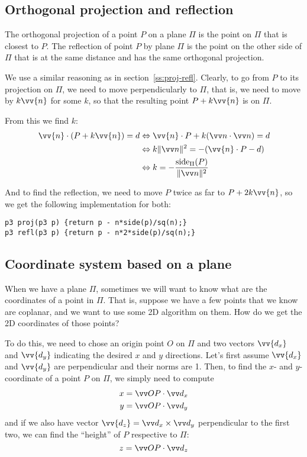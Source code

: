 \subsection{Orthogonal projection and reflection}
The orthogonal projection of a point $P$ on a plane $\Pi$ is the point on $\Pi$ that is closest to $P$. The reflection of point $P$ by plane $\Pi$ is the point on the other side of $\Pi$ that is at the same distance and has the same orthogonal projection.


We use a similar reasoning as in section~\ref{ss:proj-refl}. Clearly, to go from $P$ to its projection on $\Pi$, we need to move perpendicularly to $\Pi$, that is, we need to move by $k\vv{n}$ for some $k$, so that the resulting point $P+k\vv{n}$ is on $\Pi$.

From this we find $k$:
\begin{align*}
\vv{n}\cdot(P+k\vv{n}) = d
&\Leftrightarrow \vv{n}\cdot P + k(\dotv{n}{n}) = d \\
&\Leftrightarrow k\normv{n}^2 = -(\vv{n}\cdot P - d) \\
&\Leftrightarrow k = -\frac{\side_{\Pi}(P)}{\normv{n}^2}
\end{align*}

And to find the reflection, we need to move $P$ twice as far to $P+2k\vv{n}$, so we get the following implementation for both:
\begin{lstlisting}
p3 proj(p3 p) {return p - n*side(p)/sq(n);}
p3 refl(p3 p) {return p - n*2*side(p)/sq(n);}
\end{lstlisting}

\subsection{Coordinate system based on a plane}
When we have a plane $\Pi$, sometimes we will want to know what are the coordinates of a point in $\Pi$. That is, suppose we have a few points that we know are coplanar, and we want to use some 2D algorithm on them. How do we get the 2D coordinates of those points?

To do this, we need to chose an origin point $O$ on $\Pi$ and two vectors $\vv{d_x}$ and $\vv{d_y}$ indicating the desired $x$ and $y$ directions. Let's first assume $\vv{d_x}$ and $\vv{d_y}$ are perpendicular and their norms are 1. Then, to find the $x$- and $y$-coordinate of a point $P$ on $\Pi$, we simply need to compute
\begin{align*}
x &= \dotv{OP}{d_x} \\
y &= \dotv{OP}{d_y}
\end{align*}
and if we also have vector $\vv{d_z} = \crossv{d_x}{d_y}$ perpendicular to the first two, we can find the ``height'' of $P$ respective to $\Pi$:
\[z = \dotv{OP}{d_z}\]

